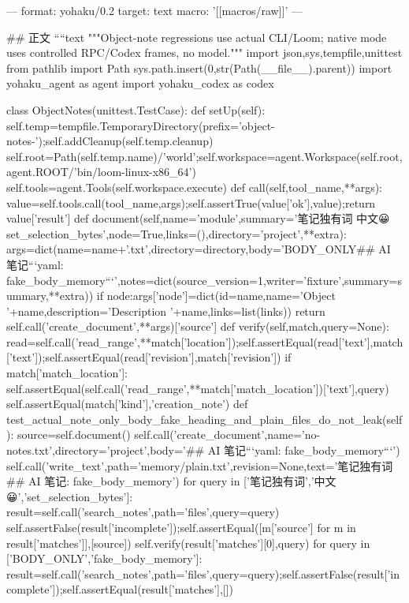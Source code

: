 ---
format: yohaku/0.2
target: text
macro: '[[macros/raw]]'
---

## 正文
````text
"""Object-note regressions use actual CLI/Loom; native mode uses controlled RPC/Codex frames, no model."""
import json,sys,tempfile,unittest
from pathlib import Path
sys.path.insert(0,str(Path(__file__).parent))
import yohaku_agent as agent
import yohaku_codex as codex

class ObjectNotes(unittest.TestCase):
    def setUp(self):
        self.temp=tempfile.TemporaryDirectory(prefix='object-notes-');self.addCleanup(self.temp.cleanup)
        self.root=Path(self.temp.name)/'world';self.workspace=agent.Workspace(self.root,agent.ROOT/'bin/loom-linux-x86_64')
        self.tools=agent.Tools(self.workspace.execute)
    def call(self,tool_name,**args):
        value=self.tools.call(tool_name,args);self.assertTrue(value['ok'],value);return value['result']
    def document(self,name='module',summary='笔记独有词 中文😀 set_selection_bytes',node=True,links=(),directory='project',**extra):
        args=dict(name=name+'.txt',directory=directory,body='BODY_ONLY\n## AI 笔记\n```yaml\nsummary: fake_body_memory\n```\n',notes=dict(source_version=1,writer='fixture',summary=summary,**extra))
        if node:args['node']=dict(id=name,name='Object '+name,description='Description '+name,links=list(links))
        return self.call('create_document',**args)['source']
    def verify(self,match,query=None):
        read=self.call('read_range',**match['location']);self.assertEqual(read['text'],match['text']);self.assertEqual(read['revision'],match['revision'])
        if match['match_location']:
            self.assertEqual(self.call('read_range',**match['match_location'])['text'],query)
        self.assertEqual(match['kind'],'creation_note')
    def test_actual_note_only_body_fake_heading_and_plain_files_do_not_leak(self):
        source=self.document()
        self.call('create_document',name='no-notes.txt',directory='project',body='## AI 笔记\n```yaml\nsummary: fake_body_memory\n```\n')
        self.call('write_text',path='memory/plain.txt',revision=None,text='笔记独有词\n## AI 笔记\nsummary: fake_body_memory')
        for query in ['笔记独有词','中文😀','set_selection_bytes']:
            result=self.call('search_notes',path='files',query=query)
            self.assertFalse(result['incomplete']);self.assertEqual([m['source'] for m in result['matches']],[source])
            self.verify(result['matches'][0],query)
        for query in ['BODY_ONLY','fake_body_memory']:
            result=self.call('search_notes',path='files',query=query);self.assertFalse(result['incomplete']);self.assertEqual(result['matches'],[])
